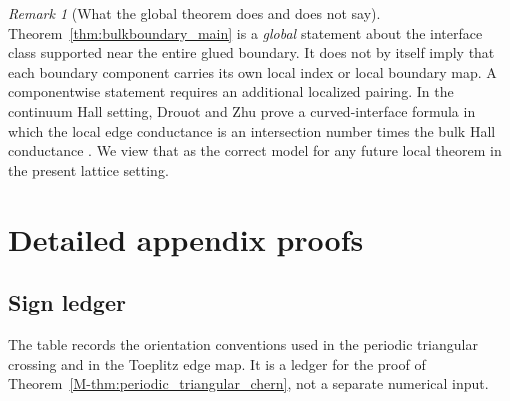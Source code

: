 \documentclass[11pt]{article}
\numberwithin{equation}{section}
\theoremstyle{definition}
\theoremstyle{remark}
\newtheorem{remark}[theorem]{Remark}
\begin{document}
\begin{remark}[What the global theorem does and does not say]\label{rem:componentwise}
Theorem~\ref{thm:bulkboundary_main} is a \emph{global} statement about the interface class
supported near the entire glued boundary. It does not by itself imply that each boundary
component carries its own local index or local boundary map. A componentwise statement requires
an additional localized pairing. In the continuum Hall setting, Drouot and Zhu prove a
curved-interface formula in which the local edge conductance is an intersection number times the
bulk Hall conductance \cite{DrouotZhuBEC,DrouotZhuEdgeSpectrum}. We view that as the correct
model for any future local theorem in the present lattice setting.
\end{remark}

\FloatBarrier



\section{Detailed appendix proofs}\label{app:proofs}


\subsection{Sign ledger}\label{app:sign_ledger}
The table records the orientation conventions used in the periodic triangular crossing and in the
Toeplitz edge map. It is a ledger for the proof of Theorem~\ref{M-thm:periodic_triangular_chern}, not
a separate numerical input.
\end{document}
